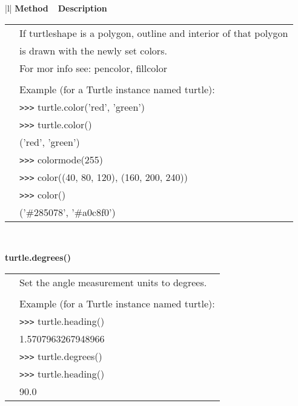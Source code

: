 \begin{center}
{\small
\begin{tabular}{|l|} \hline
{\bf Method~~Description}  \\ \hline\hline
   \begin{tabular}{p{0.25in}p{4in}}

&        If turtleshape is a polygon, outline and interior of that polygon \\
&        is drawn with the newly set colors. \\
&        For mor info see: pencolor, fillcolor \\
&  \\
&        Example (for a Turtle instance named turtle): \\
&        \verb+>+\verb+>+\verb+>+ turtle.color('red', 'green') \\
&        \verb+>+\verb+>+\verb+>+ turtle.color() \\
&        ('red', 'green') \\
&        \verb+>+\verb+>+\verb+>+ colormode(255) \\
&        \verb+>+\verb+>+\verb+>+ color((40, 80, 120), (160, 200, 240)) \\
&        \verb+>+\verb+>+\verb+>+ color() \\
&        ('\#285078', '\#a0c8f0') \\
\end{tabular} \\ \hline

{\bf    turtle.degrees()} \\
   \begin{tabular}{p{0.25in}p{4in}}
&        Set the angle measurement units to degrees. \\
&  \\
&        Example (for a Turtle instance named turtle): \\
&        \verb+>+\verb+>+\verb+>+ turtle.heading() \\
&        1.5707963267948966 \\
&        \verb+>+\verb+>+\verb+>+ turtle.degrees() \\
&        \verb+>+\verb+>+\verb+>+ turtle.heading() \\
&        90.0 \\
\end{tabular} \\ \hline


\end{tabular}}
\end{center}
